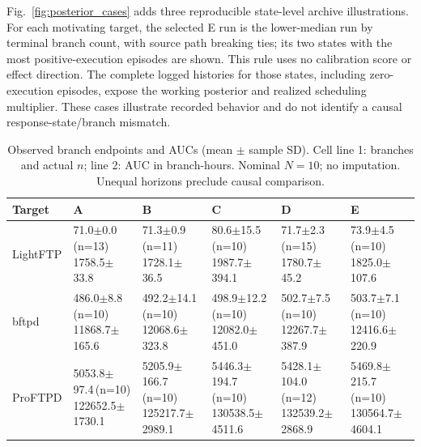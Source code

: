 \documentclass[final,5p,times,number]{elsarticle}
\newcommand{\figref}[1]{Fig.~\ref{#1}}
\begin{document}
\figref{fig:posterior_cases} adds three reproducible state-level archive illustrations. For each motivating target, the selected E run is the lower-median run by terminal branch count, with source path breaking ties; its two states with the most positive-execution episodes are shown. This rule uses no calibration score or effect direction. The complete logged histories for those states, including zero-execution episodes, expose the working posterior and realized scheduling multiplier. These cases illustrate recorded behavior and do not identify a causal response-state/branch mismatch.



\begin{table}[!tbp]
\centering\small
\caption{Observed branch endpoints and AUCs (mean $\pm$ sample SD). Cell line 1: branches and actual $n$; line 2: AUC in branch-hours. Nominal $N=10$; no imputation. Unequal horizons preclude causal comparison.}
\label{tab:mainresults}
\begin{tabularx}{\textwidth}{l *{5}{>{\centering\arraybackslash}X}}
\toprule
Target & A & B & C & D & E \\
\midrule
LightFTP & \shortstack{71.0$\pm$0.0\,(n=13)\\1758.5$\pm$33.8} & \shortstack{71.3$\pm$0.9\,(n=11)\\1728.1$\pm$36.5} & \shortstack{80.6$\pm$15.5\,(n=10)\\1987.7$\pm$394.1} & \shortstack{71.7$\pm$2.3\,(n=15)\\1780.7$\pm$45.2} & \shortstack{73.9$\pm$4.5\,(n=10)\\1825.0$\pm$107.6} \\
\addlinespace[3pt]
bftpd & \shortstack{486.0$\pm$8.8\,(n=10)\\11868.7$\pm$165.6} & \shortstack{492.2$\pm$14.1\,(n=10)\\12068.6$\pm$323.8} & \shortstack{498.9$\pm$12.2\,(n=10)\\12082.0$\pm$451.0} & \shortstack{502.7$\pm$7.5\,(n=10)\\12267.7$\pm$387.9} & \shortstack{503.7$\pm$7.1\,(n=10)\\12416.6$\pm$220.9} \\
\addlinespace[3pt]
ProFTPD & \shortstack{5053.8$\pm$97.4\,(n=10)\\122652.5$\pm$1730.1} & \shortstack{5205.9$\pm$166.7\,(n=10)\\125217.7$\pm$2989.1} & \shortstack{5446.3$\pm$194.7\,(n=10)\\130538.5$\pm$4511.6} & \shortstack{5428.1$\pm$104.0\,(n=12)\\132539.2$\pm$2868.9} & \shortstack{5469.8$\pm$215.7\,(n=10)\\130564.7$\pm$4604.1} \\

\end{tabularx}
\end{table}
\end{document}
